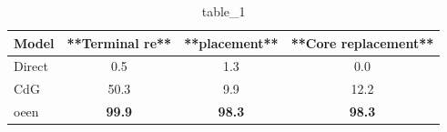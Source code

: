 \begin{table}[t]
\centering
\caption{table_1}
\label{tab:2510.14455}
\begin{tabular}{lccc}
\toprule
Model & **Terminal re** & **placement** & **Core replacement** \\
\midrule
Direct & 0.5 & 1.3 & 0.0 \\
CdG & 50.3 & 9.9 & 12.2 \\
oeen & \textbf{99.9} & \textbf{98.3} & \textbf{98.3} \\
\bottomrule
\end{tabular}
\end{table}
